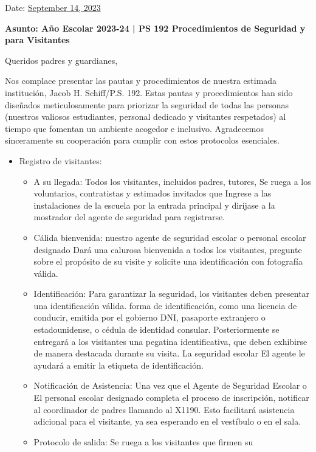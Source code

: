 \documentclass[12pt,letterpaper]{article}
\begin{document}
\vspace*{0.5in}
Date: \href{https://www.ps192.org/apps/bbmessages/show_bbm.jsp?REC_ID=139439}{September 14, 2023} 

\textbf{Asunto: Año Escolar 2023-24 | PS 192 Procedimientos de Seguridad y para Visitantes}

Queridos padres y guardianes,

Nos complace presentar las pautas y procedimientos de nuestra estimada institución, Jacob H. Schiff/P.S. 192. Estas pautas y procedimientos han sido diseñados meticulosamente para priorizar la seguridad de todas las personas (nuestros valiosos estudiantes, personal dedicado y visitantes respetados) al tiempo que fomentan un ambiente acogedor e inclusivo. Agradecemos sinceramente su cooperación para cumplir con estos protocolos esenciales.
\begin{itemize}
	\item Registro de visitantes:
		\begin{itemize}
		\item A su llegada: Todos los visitantes, incluidos padres, tutores,
Se ruega a los voluntarios, contratistas y estimados invitados que Ingrese a las instalaciones de la escuela por la entrada principal y diríjase a la mostrador del agente de seguridad para registrarse.
		\item Cálida bienvenida: nuestro agente de seguridad escolar o personal escolar designado Dará una calurosa bienvenida a todos los visitantes, pregunte sobre el propósito de su visite y solicite una identificación con fotografía válida.
		\item Identificación: Para garantizar la seguridad, los visitantes deben presentar una identificación válida.
forma de identificación, como una licencia de conducir, emitida por el gobierno
DNI, pasaporte extranjero o estadounidense, o cédula de identidad consular.
Posteriormente se entregará a los visitantes una pegatina identificativa, que
deben exhibirse de manera destacada durante su visita. La seguridad escolar
El agente le ayudará a emitir la etiqueta de identificación.
		\item Notificación de Asistencia: Una vez que el Agente de Seguridad 
		Escolar o El personal escolar designado completa el proceso de 
		inscripción, notificar al coordinador de padres llamando al X1190. Esto facilitará asistencia adicional para el visitante, ya sea esperando en el vestíbulo o en el sala.
		\item Protocolo de salida: Se ruega a los visitantes que firmen su 

\end{itemize}
\end{itemize}
\end{document}
